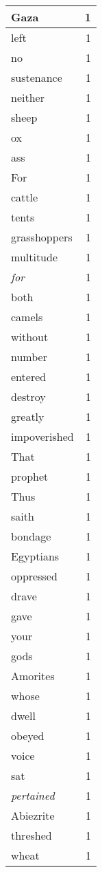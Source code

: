 \begin{center}
\begin{longtable}{l|r}
Gaza & 1\\ \hline 
left & 1\\ \hline 
no & 1\\ \hline 
sustenance & 1\\ \hline 
neither & 1\\ \hline 
sheep & 1\\ \hline 
ox & 1\\ \hline 
ass & 1\\ \hline 
For & 1\\ \hline 
cattle & 1\\ \hline 
tents & 1\\ \hline 
grasshoppers & 1\\ \hline 
multitude & 1\\ \hline 
\emph{for} & 1\\ \hline 
both & 1\\ \hline 
camels & 1\\ \hline 
without & 1\\ \hline 
number & 1\\ \hline 
entered & 1\\ \hline 
destroy & 1\\ \hline 
greatly & 1\\ \hline 
impoverished & 1\\ \hline 
That & 1\\ \hline 
prophet & 1\\ \hline 
Thus & 1\\ \hline 
saith & 1\\ \hline 
bondage & 1\\ \hline 
Egyptians & 1\\ \hline 
oppressed & 1\\ \hline 
drave & 1\\ \hline 
gave & 1\\ \hline 
your & 1\\ \hline 
gods & 1\\ \hline 
Amorites & 1\\ \hline 
whose & 1\\ \hline 
dwell & 1\\ \hline 
obeyed & 1\\ \hline 
voice & 1\\ \hline 
sat & 1\\ \hline 
\emph{pertained} & 1\\ \hline 
Abiezrite & 1\\ \hline 
threshed & 1\\ \hline 
wheat & 1\\ \hline 

\end{longtable}
\end{center}
